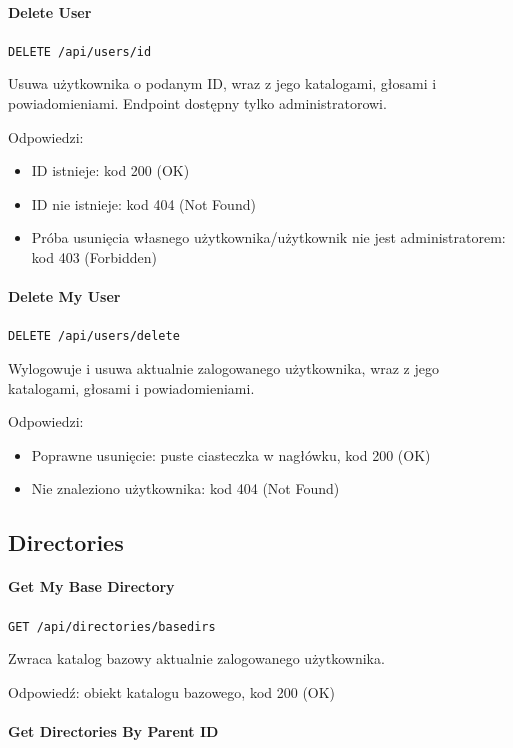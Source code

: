 \documentclass[a4paper,twoside,12pt]{book}
\begin{document}
\paragraph{Delete User}\label{delete-user}

\texttt{DELETE /api/users/{id}}

Usuwa użytkownika o podanym ID, wraz z jego katalogami, głosami i powiadomieniami. Endpoint dostępny tylko administratorowi.

Odpowiedzi: 
\begin{itemize}
	\item ID istnieje: kod 200 (OK) 
	\item ID nie istnieje: kod 404 (Not Found) 
	\item Próba usunięcia własnego użytkownika/użytkownik nie jest administratorem: kod 403 (Forbidden)
\end{itemize}

\paragraph{Delete My User}\label{delete-my-user}

\texttt{DELETE /api/users/delete}

Wylogowuje i usuwa aktualnie zalogowanego użytkownika, wraz z jego katalogami, głosami i powiadomieniami.

Odpowiedzi: 
\begin{itemize}
	\item  Poprawne usunięcie: puste ciasteczka w nagłówku, kod 200 (OK) 
	\item  Nie znaleziono użytkownika: kod 404 (Not Found)
\end{itemize}

\subsection{Directories}\label{directories}

\paragraph{Get My Base Directory}\label{get-my-base-directory}

\texttt{GET /api/directories/basedirs}

Zwraca katalog bazowy aktualnie zalogowanego użytkownika.

Odpowiedź: obiekt katalogu bazowego, kod 200 (OK)

\paragraph{Get Directories By Parent ID}\label{get-directories-by-parent-id}
\end{document}
